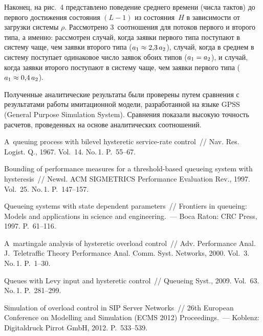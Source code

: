 \begin{multicols}{2}
Наконец, на рис.~4 представлено поведение
среднего времени (числа тактов) до первого достижения
состояния $(L-1)$ из состояния~$H$ в зависимости от
загрузки системы $\rho$.
Рассмотрено 3~соотношения для потоков первого и
второго типа, а именно: рассмотрен случай, когда заявки первого
типа поступают в систему чаще, чем заявки второго
типа (${a_1 \hm\approx 2{,}3\, a_2}$),
случай, когда в среднем в систему поступает
одинаковое число заявок обоих типов (${a_1 \hm= a_2}$),
и случай, когда заявки второго поступают в систему
чаще, чем заявки первого типа (${a_1 \hm\approx 0{,}4\, a_2}$).



Полученные аналитические результаты были проверены
путем сравнения с результатами работы имитационной
модели, разработанной на языке GPSS (General Purpose Simulation System).
Сравнения показали высокую точность расчетов,
проведенных на основе аналитических соотношений.

\vspace*{-9pt}


{\small\frenchspacing
{%
\begin{thebibliography}{99}



A~queuing process with bilevel hysteretic service-rate control~//
Nav. Res. Logist. Q., 1967. Vol.~14. No.\,1. P.~55--67.
\columnbreak

Bounding of performance measures for a
threshold-based queueing system with hysteresis~//
Newsl. ACM SIGMETRICS Performance Evaluation Rev., 1997.
Vol.~25. No.\,1. P.~147--157.



 Queueing systems with state dependent
parameters~// Frontiers in queueing: Models and applications in
science and engineering.~--- Boca Raton: CRC Press, 1997.
P.~61--116.

 A~martingale analysis of hysteretic
overload control~// Adv. Performance Anal. J.~Teletraffic Theory
Performance Anal. Comm. Syst.
Networks, 2000. Vol.~3. No.\,1. P.~1--30.

Queues with Levy input and hysteretic control~//
Queueing Syst., 2009. Vol.~63. No.\,1. P.~281--299.

Simulation of overload control in SIP Server Networks~//
26th European Conference on Modelling and
Simulation (ECMS 2012) Proceedings.~--- Koblenz: Digitaldruck Pirrot GmbH, 2012.
P.~533--539.


\end{thebibliography}}}
\end{multicols}
